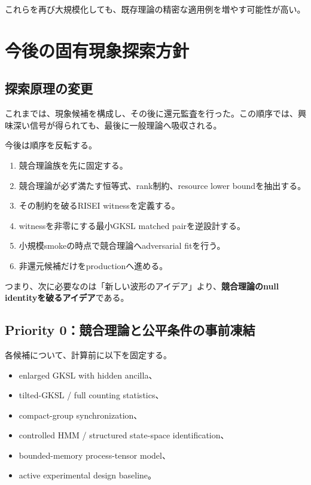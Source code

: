 \documentclass[11pt,a4paper,uplatex,dvipdfmx]{bxjsarticle}
\theoremstyle{remark}
\begin{document}
これらを再び大規模化しても、既存理論の精密な適用例を増やす可能性が高い。

\section{今後の固有現象探索方針}

\subsection{探索原理の変更}

これまでは、現象候補を構成し、その後に還元監査を行った。この順序では、興味深い信号が得られても、最後に一般理論へ吸収される。

今後は順序を反転する。

\begin{decisionbox}[新しい探索順序]
\begin{enumerate}
  \item 競合理論族を先に固定する。
  \item 競合理論が必ず満たす恒等式、rank制約、resource lower boundを抽出する。
  \item その制約を破るRISEI witnessを定義する。
  \item witnessを非零にする最小GKSL matched pairを逆設計する。
  \item 小規模smokeの時点で競合理論へadversarial fitを行う。
  \item 非還元候補だけをproductionへ進める。
\end{enumerate}
\end{decisionbox}

つまり、次に必要なのは「新しい波形のアイデア」より、\textbf{競合理論のnull identityを破るアイデア}である。

\subsection{Priority 0：競合理論と公平条件の事前凍結}

各候補について、計算前に以下を固定する。

\begin{itemize}
  \item enlarged GKSL with hidden ancilla、
  \item tilted-GKSL / full counting statistics、
  \item compact-group synchronization、
  \item controlled HMM / structured state-space identification、
  \item bounded-memory process-tensor model、
  \item active experimental design baseline。
\end{itemize}
\end{document}
